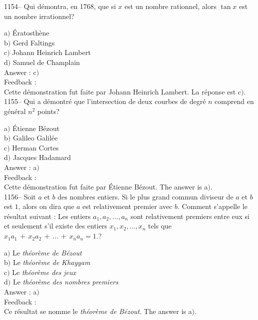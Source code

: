 \documentclass[letterpaper, 12pt]{article}
\begin{document}
1154-- Qui d\'emontra, en 1768, que si $x$ est un nombre rationnel,
alors $\tan x$ est un nombre irrationnel?

a$)$ \'Eratosth\`ene \\
b$)$ Gerd Faltings \\
c$)$ Johann Heinrich Lambert \\
d$)$ Samuel de Champlain\\

Answer : c$)$\\

Feedback : \\
Cette d\'emonstration fut faite par Johann Heinrich Lambert. La r\'eponse
est c$)$.\\

1155-- Qui a d\'emontr\'e que l'intersection de deux courbes de
degr\'e $n$ comprend en g\'en\'eral $n^2$ points?

a$)$ \'Etienne B\'ezout \\
b$)$ Galileo Galil\'ee \\
c$)$ Herman Cortes \\
d$)$ Jacques Hadamard\\

Answer : a$)$\\

Feedback : \\
Cette d\'emonstration fut faite par \'Etienne B\'ezout. The answer is
a$)$.\\

1156-- Soit $a$ et $b$ des nombres entiers. Si le plus grand commun
diviseur de $a$ et $b$ est $1$, alors on dira que $a$ est
relativement premier avec $b$. Comment s'appelle le r\'esultat
suivant : \og Les entiers $a_1,a_2,\ldots,a_n$ sont relativement
premiers entre eux si et seulement s'il existe des entiers
$x_1,x_2,\ldots,x_n$ tels que
$x_1a_1\,+\,x_2a_2\,+\,\ldots\,+\,x_na_n=1.$\fg ?

a$)$ Le {\sl th\'eor\`eme de B\'ezout} \\
b$)$ Le {\sl th\'eor\`eme de Khayyam} \\
c$)$ Le {\sl th\'eor\`eme des jeux} \\
d$)$ Le {\sl th\'eor\`eme des nombres premiers}\\

Answer : a$)$\\

Feedback : \\
Ce r\'esultat se nomme le {\sl th\'eor\`eme de B\'ezout}. The answer is
a$)$.\\
\end{document}
